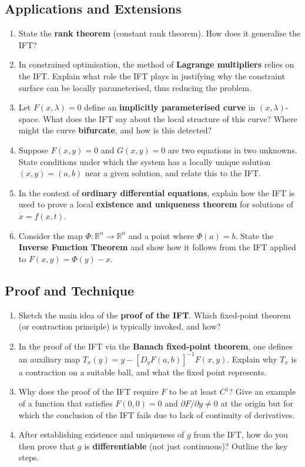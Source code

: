 \subsection{Applications and Extensions}

\begin{enumerate}[resume]
  \item State the \textbf{rank theorem} (constant rank theorem). How does it generalise the IFT?
  \item In constrained optimisation, the method of \textbf{Lagrange multipliers} relies on the IFT. Explain what role the IFT plays in justifying why the constraint surface can be locally parameterised, thus reducing the problem.
  \item Let $F(x, \lambda) = 0$ define an \textbf{implicitly parameterised curve} in $(x,\lambda)$-space. What does the IFT say about the local structure of this curve? Where might the curve \textbf{bifurcate}, and how is this detected?
  \item Suppose $F(x,y) = 0$ and $G(x,y) = 0$ are two equations in two unknowns. State conditions under which the system has a locally unique solution $(x,y) = (a,b)$ near a given solution, and relate this to the IFT.
  \item In the context of \textbf{ordinary differential equations}, explain how the IFT is used to prove a local \textbf{existence and uniqueness theorem} for solutions of $\dot{x} = f(x,t)$.
  \item Consider the map $\Phi : \mathbb{R}^n \to \mathbb{R}^n$ and a point where $\Phi(a) = b$. State the \textbf{Inverse Function Theorem} and show how it follows from the IFT applied to $F(x,y) = \Phi(y) - x$.
\end{enumerate}

\subsection{Proof and Technique}

\begin{enumerate}[resume]
  \item Sketch the main idea of the \textbf{proof of the IFT}. Which fixed-point theorem (or contraction principle) is typically invoked, and how?
  \item In the proof of the IFT via the \textbf{Banach fixed-point theorem}, one defines an auxiliary map $T_x(y) = y - [D_y F(a,b)]^{-1} F(x,y)$. Explain why $T_x$ is a contraction on a suitable ball, and what the fixed point represents.
  \item Why does the proof of the IFT require $F$ to be at least $C^1$? Give an example of a function that satisfies $F(0,0) = 0$ and $\partial F/\partial y \neq 0$ at the origin but for which the conclusion of the IFT fails due to lack of continuity of derivatives.
  \item After establishing existence and uniqueness of $g$ from the IFT, how do you then prove that $g$ is \textbf{differentiable} (not just continuous)? Outline the key steps.
\end{enumerate}


